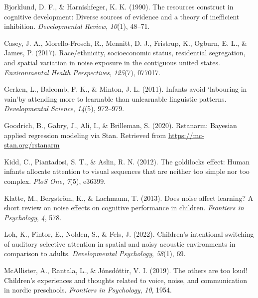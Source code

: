 \documentclass[10pt, letterpaper]{article}
\newenvironment{CSLReferences}%
  {}%
  {\par}
\begin{document}
\hypertarget{refs}{}
\begin{CSLReferences}{1}{0}
\leavevmode{}%
Bjorklund, D. F., \& Harnishfeger, K. K. (1990). The resources construct
in cognitive development: Diverse sources of evidence and a theory of
inefficient inhibition. \emph{Developmental Review}, \emph{10}(1),
48--71.

\leavevmode{}%
Casey, J. A., Morello-Frosch, R., Mennitt, D. J., Fristrup, K., Ogburn,
E. L., \& James, P. (2017). Race/ethnicity, socioeconomic status,
residential segregation, and spatial variation in noise exposure in the
contiguous united states. \emph{Environmental Health Perspectives},
\emph{125}(7), 077017.

\leavevmode{}%
Gerken, L., Balcomb, F. K., \& Minton, J. L. (2011). Infants avoid
`labouring in vain'by attending more to learnable than unlearnable
linguistic patterns. \emph{Developmental Science}, \emph{14}(5),
972--979.

\leavevmode{}%
Goodrich, B., Gabry, J., Ali, I., \& Brilleman, S. (2020). Rstanarm:
{Bayesian} applied regression modeling via {Stan}. Retrieved from
\url{https://mc-stan.org/rstanarm}

\leavevmode{}%
Kidd, C., Piantadosi, S. T., \& Aslin, R. N. (2012). The goldilocks
effect: Human infants allocate attention to visual sequences that are
neither too simple nor too complex. \emph{PloS One}, \emph{7}(5),
e36399.

\leavevmode{}%
Klatte, M., Bergström, K., \& Lachmann, T. (2013). Does noise affect
learning? A short review on noise effects on cognitive performance in
children. \emph{Frontiers in Psychology}, \emph{4}, 578.

\leavevmode{}%
Loh, K., Fintor, E., Nolden, S., \& Fels, J. (2022). Children's
intentional switching of auditory selective attention in spatial and
noisy acoustic environments in comparison to adults. \emph{Developmental
Psychology}, \emph{58}(1), 69.

\leavevmode{}%
McAllister, A., Rantala, L., \& Jónsdóttir, V. I. (2019). The others are
too loud! Children's experiences and thoughts related to voice, noise,
and communication in nordic preschools. \emph{Frontiers in Psychology},
\emph{10}, 1954.


\end{CSLReferences}
\end{document}
